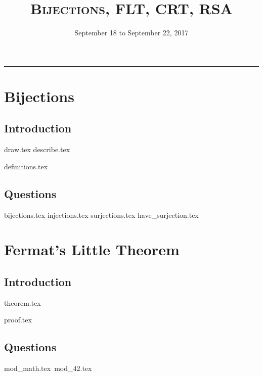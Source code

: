 \documentclass{exam}
\title{\textsc{Bijections, FLT, CRT, RSA}}
\date{September 18 to September 22, 2017}
\begin{document}
\maketitle
\rule{\textwidth}{0.15em}
\fontsize{12}{15}\selectfont
\thispagestyle{empty}

\section{Bijections}
\subsection{Introduction}
\begin{questions}
{draw.tex}
{describe.tex}
\end{questions}
{definitions.tex}
\subsection{Questions}
\begin{questions}
{bijections.tex}
{injections.tex}
{surjections.tex}
{have_surjection.tex}
\end{questions}

\section{Fermat's Little Theorem}
\subsection{Introduction}
{theorem.tex}
\begin{questions}
{proof.tex}
\end{questions}
\subsection{Questions}
\begin{questions}
{mod_math.tex}\
{mod_42.tex}
\end{questions}
\end{document}
